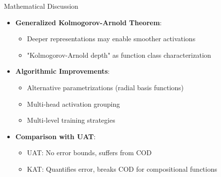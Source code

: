\documentclass{beamer}
\begin{document}
\begin{frame}{Mathematical Discussion}
\begin{itemize}
    \item \textbf{Generalized Kolmogorov-Arnold Theorem}: 
    \begin{itemize}
        \item Deeper representations may enable smoother activations
        \item "Kolmogorov-Arnold depth" as function class characterization
    \end{itemize}
    
    \item \textbf{Algorithmic Improvements}:
    \begin{itemize}
        \item Alternative parametrizations (radial basis functions)
        \item Multi-head activation grouping
        \item Multi-level training strategies
    \end{itemize}
    
    \item \textbf{Comparison with UAT}:
    \begin{itemize}
        \item UAT: No error bounds, suffers from COD
        \item KAT: Quantifies error, breaks COD for compositional functions
    \end{itemize}
\end{itemize}
\end{frame}
\end{document}

